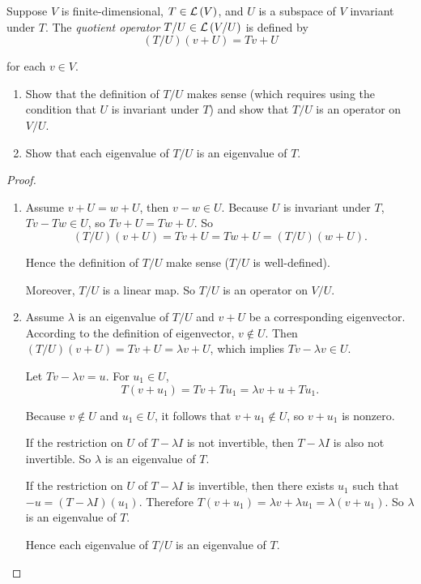 \begin{exercise}
    Suppose $V$ is finite-dimensional, $T\in\mathcal{L}\left({V}\right)$, and $U$ is a subspace of $V$ invariant under $T$. The \textit{quotient operator} $T/U\in\mathcal{L}\left({V/U}\right)$ is defined by
    \[
        (T/U)(v + U) = Tv + U
    \]

    for each $v\in V$.
    \begin{enumerate}[label={(\alph*)}]
        \item Show that the definition of $T/U$ makes sense (which requires using the
              condition that $U$ is invariant under $T$) and show that $T/U$ is an operator
              on $V/U$.
        \item Show that each eigenvalue of $T/U$ is an eigenvalue of $T$.
    \end{enumerate}
\end{exercise}

\begin{proof}
    \begin{enumerate}[label={(\alph*)}]
        \item Assume $v + U = w + U$, then $v - w\in U$. Because $U$ is invariant under $T$, $Tv - Tw\in U$, so $Tv + U = Tw + U$. So
              \[
                  (T/U)(v + U) = Tv + U = Tw + U = (T/U)(w + U).
              \]

              Hence the definition of $T/U$ make sense ($T/U$ is well-defined).

              Moreover, $T/U$ is a linear map. So $T/U$ is an operator on $V/U$.
        \item Assume $\lambda$ is an eigenvalue of $T/U$ and $v + U$ be a corresponding eigenvector. According to the definition of eigenvector, $v\notin U$. Then $(T/U)(v + U) = Tv + U = \lambda v + U$, which implies $Tv - \lambda v \in U$.

              Let $Tv - \lambda v = u$. For $u_{1}\in U$,
              \[
                  T(v + u_{1}) = Tv + Tu_{1} = \lambda v + u + Tu_{1}.
              \]

              Because $v\notin U$ and $u_{1}\in U$, it follows that $v + u_{1}\notin U$, so $v + u_{1}$ is nonzero.

              If the restriction on $U$ of $T - \lambda I$ is not invertible, then $T - \lambda I$ is also not invertible. So $\lambda$ is an eigenvalue of $T$.

              If the restriction on $U$ of $T - \lambda I$ is invertible, then there exists $u_{1}$ such that $-u = (T - \lambda I)(u_{1})$. Therefore $T(v + u_{1}) = \lambda v + \lambda u_{1} = \lambda (v + u_{1})$. So $\lambda$ is an eigenvalue of $T$.

              Hence each eigenvalue of $T/U$ is an eigenvalue of $T$.
    \end{enumerate}
\end{proof}
\newpage

